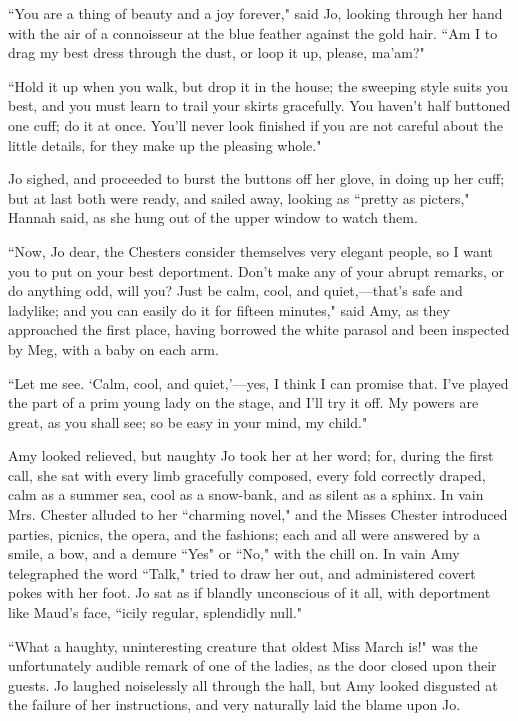 ``You are a thing of beauty and a joy forever," said Jo, looking through
her hand with the air of a connoisseur at the blue feather against the
gold hair. ``Am I to drag my best dress through the dust, or loop it up,
please, ma'am?"

``Hold it up when you walk, but drop it in the house; the sweeping style
suits you best, and you must learn to trail your skirts gracefully. You
haven't half buttoned one cuff; do it at once.
You'll never look finished if you are not careful about
the little details, for they make up the pleasing whole."

Jo sighed, and proceeded to burst the buttons off her glove, in doing up
her cuff; but at last both were ready, and sailed away, looking as
``pretty as picters," Hannah said, as she hung out of the upper window to
watch them.

``Now, Jo dear, the Chesters consider themselves very elegant people, so
I want you to put on your best deportment. Don't make
any of your abrupt remarks, or do anything odd, will you? Just be calm,
cool, and quiet,---that's safe and ladylike; and you can
easily do it for fifteen minutes," said Amy, as they approached the
first place, having borrowed the white parasol and been inspected by
Meg, with a baby on each arm.

``Let me see. `Calm, cool, and
quiet,'---yes, I think I can promise that.
I've played the part of a prim young lady on the stage,
and I'll try it off. My powers are great, as you shall
see; so be easy in your mind, my child."

Amy looked relieved, but naughty Jo took her at her word; for, during
the first call, she sat with every limb gracefully composed, every fold
correctly draped, calm as a summer sea, cool as a snow-bank, and as
silent as a sphinx. In vain Mrs. Chester alluded to her ``charming
novel," and the Misses Chester introduced parties, picnics, the opera,
and the fashions; each and all were answered by a smile, a bow, and a
demure ``Yes" or ``No," with the chill on. In vain Amy telegraphed the
word ``Talk," tried to draw her out, and administered covert pokes with
her foot. Jo sat as if blandly unconscious of it all, with deportment
like Maud's face, ``icily regular, splendidly null."

``What a haughty, uninteresting creature that oldest Miss March is!" was
the unfortunately audible remark of one of the ladies, as the door
closed upon their guests. Jo laughed noiselessly all through the hall,
but Amy looked disgusted at the failure of her instructions, and very
naturally laid the blame upon Jo.

